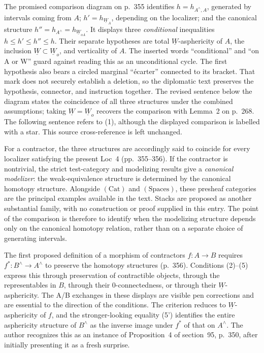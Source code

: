 The promised comparison diagram on p.~355 identifies $h=h_{A^{\wedge},A}$, generated by intervals coming from $A$; $h'=h_{\underline W_A}$, depending on the localizer; and the canonical structure $h''=h_{A^{\wedge}}=h_{\underline W_{oA}}$. It displays three \emph{conditional} inequalities $h\leq h'\leq h''\leq h$. Their separate hypotheses are total $\underline W$-asphericity of $A$, the inclusion $\underline W\subset\underline W_o$, and verticality of $A$. The inserted words ``conditional'' and ``on A or W'' guard against reading this as an unconditional cycle. The first hypothesis also bears a circled marginal ``\'ecarter'' connected to its bracket. That mark does not securely establish a deletion, so the diplomatic text preserves the hypothesis, connector, and instruction together. The revised sentence below the diagram states the coincidence of all three structures under the combined assumptions; taking $\underline W=\underline W_o$ recovers the comparison with Lemma~2 on p.~268. The following sentence refers to (1), although the displayed comparison is labelled with a star. This source cross-reference is left unchanged.

For a contractor, the three structures are accordingly said to coincide for every localizer satisfying the present Loc~4 (pp.~355--356). If the contractor is nontrivial, the strict test-category and modelizing results give a \emph{canonical modelizer}: the weak-equivalence structure is determined by the canonical homotopy structure. Alongside $(\mathrm{Cat})$ and $(\mathrm{Spaces})$, these presheaf categories are the principal examples available in the text. Stacks are proposed as another substantial family, with no construction or proof supplied in this entry. The point of the comparison is therefore to identify when the modelizing structure depends only on the canonical homotopy relation, rather than on a separate choice of generating intervals.

The first proposed definition of a morphism of contractors $f:A\to B$ requires $f^*:B^{\wedge}\to A^{\wedge}$ to preserve the homotopy structures (p.~356). Conditions (2)--(5) express this through preservation of contractible objects, through the representables in $B$, through their 0-connectedness, or through their $\underline W$-asphericity. The A/B exchanges in these displays are visible pen corrections and are essential to the direction of the conditions. The criterion reduces to $\underline W$-asphericity of $f$, and the stronger-looking equality (5') identifies the entire asphericity structure of $B^{\wedge}$ as the inverse image under $f^*$ of that on $A^{\wedge}$. The author recognizes this as an instance of Proposition~4 of section~95, p.~350, after initially presenting it as a fresh surprise.

